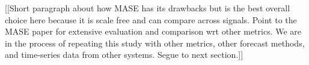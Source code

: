 [[Short paragraph about how MASE has its drawbacks but is the best
    overall choice here because it is scale free and can compare
    across signals.  Point to the MASE paper for extensive evaluation
    and comparison wrt other metrics. We are in the process of
    repeating this study with other metrics, other forecast methods,
    and time-series data from other systems.  Segue to next section.]]







